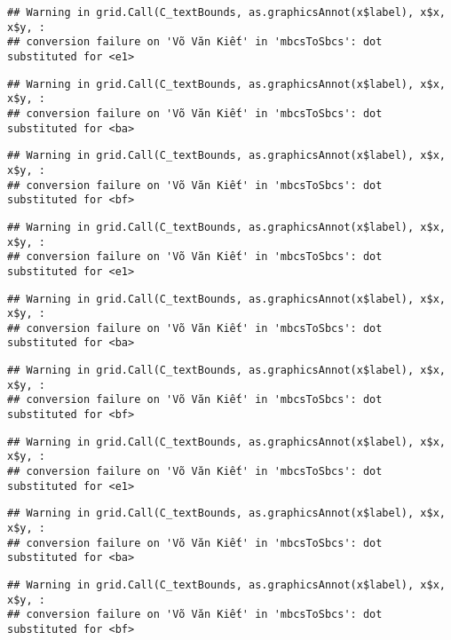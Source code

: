 \documentclass[
]{article}
\begin{document}
\begin{verbatim}
## Warning in grid.Call(C_textBounds, as.graphicsAnnot(x$label), x$x, x$y, :
## conversion failure on 'Võ Văn Kiết' in 'mbcsToSbcs': dot substituted for <e1>
\end{verbatim}

\begin{verbatim}
## Warning in grid.Call(C_textBounds, as.graphicsAnnot(x$label), x$x, x$y, :
## conversion failure on 'Võ Văn Kiết' in 'mbcsToSbcs': dot substituted for <ba>
\end{verbatim}

\begin{verbatim}
## Warning in grid.Call(C_textBounds, as.graphicsAnnot(x$label), x$x, x$y, :
## conversion failure on 'Võ Văn Kiết' in 'mbcsToSbcs': dot substituted for <bf>
\end{verbatim}

\begin{verbatim}
## Warning in grid.Call(C_textBounds, as.graphicsAnnot(x$label), x$x, x$y, :
## conversion failure on 'Võ Văn Kiết' in 'mbcsToSbcs': dot substituted for <e1>
\end{verbatim}

\begin{verbatim}
## Warning in grid.Call(C_textBounds, as.graphicsAnnot(x$label), x$x, x$y, :
## conversion failure on 'Võ Văn Kiết' in 'mbcsToSbcs': dot substituted for <ba>
\end{verbatim}

\begin{verbatim}
## Warning in grid.Call(C_textBounds, as.graphicsAnnot(x$label), x$x, x$y, :
## conversion failure on 'Võ Văn Kiết' in 'mbcsToSbcs': dot substituted for <bf>
\end{verbatim}

\begin{verbatim}
## Warning in grid.Call(C_textBounds, as.graphicsAnnot(x$label), x$x, x$y, :
## conversion failure on 'Võ Văn Kiết' in 'mbcsToSbcs': dot substituted for <e1>
\end{verbatim}

\begin{verbatim}
## Warning in grid.Call(C_textBounds, as.graphicsAnnot(x$label), x$x, x$y, :
## conversion failure on 'Võ Văn Kiết' in 'mbcsToSbcs': dot substituted for <ba>
\end{verbatim}

\begin{verbatim}
## Warning in grid.Call(C_textBounds, as.graphicsAnnot(x$label), x$x, x$y, :
## conversion failure on 'Võ Văn Kiết' in 'mbcsToSbcs': dot substituted for <bf>
\end{verbatim}
\end{document}
